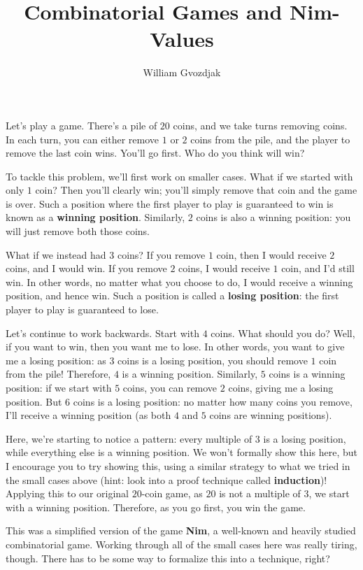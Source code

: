 \documentclass{article}
\title{Combinatorial Games and Nim-Values}
\author{William Gvozdjak}
\begin{document}
\maketitle
Let's play a game. There's a pile of $20$ coins, and we take turns removing coins. In each turn, you can either remove $1$ or $2$ coins from the pile, and the player to remove the last coin wins. You'll go first. Who do you think will win?

To tackle this problem, we'll first work on smaller cases. What if we started with only $1$ coin? Then you'll clearly win; you'll simply remove that coin and the game is over. Such a position where the first player to play is guaranteed to win is known as a \textbf{winning position}. Similarly, $2$ coins is also a winning position: you will just remove both those coins.

What if we instead had $3$ coins? If you remove $1$ coin, then I would receive $2$ coins, and I would win. If you remove $2$ coins, I would receive $1$ coin, and I'd still win. In other words, no matter what you choose to do, I would receive a winning position, and hence win. Such a position is called a \textbf{losing position}: the first player to play is guaranteed to lose.

Let's continue to work backwards. Start with $4$ coins. What should you do? Well, if you want to win, then you want me to lose. In other words, you want to give me a losing position: as $3$ coins is a losing position, you should remove $1$ coin from the pile! Therefore, $4$ is a winning position. Similarly, $5$ coins is a winning position: if we start with $5$ coins, you can remove $2$ coins, giving me a losing position. But $6$ coins is a losing position: no matter how many coins you remove, I'll receive a winning position (as both $4$ and $5$ coins are winning positions).

Here, we're starting to notice a pattern: every multiple of $3$ is a losing position, while everything else is a winning position. We won't formally show this here, but I encourage you to try showing this, using a similar strategy to what we tried in the small cases above (hint: look into a proof technique called \textbf{induction})! Applying this to our original $20$-coin game, as $20$ is not a multiple of $3$, we start with a winning position. Therefore, as you go first, you win the game.

This was a simplified version of the game \textbf{Nim}, a well-known and heavily studied combinatorial game. Working through all of the small cases here was really tiring, though. There has to be some way to formalize this into a technique, right?
\end{document}
